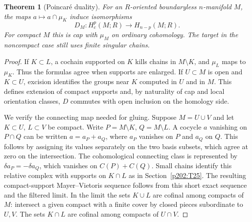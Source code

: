 \documentclass[11pt,oneside,openany]{book}
\theoremstyle{plain}
\newtheorem{theorem}{Theorem}[chapter]
\theoremstyle{definition}
\theoremstyle{remark}
\begin{document}
\begin{theorem}[Poincar\'e duality]\label{thm:p202-poincare}
For an \(R\)-oriented boundaryless \(n\)-manifold \(M\), the
maps \(a\mapsto a\cap\mu_K\) induce isomorphisms
\[
 D_M:H_c^p(M;R)\longrightarrow H_{n-p}(M;R).
\]
For compact \(M\) this is cap with \(\mu_M\) on ordinary
cohomology. The target in the noncompact case still uses
finite singular chains.
\end{theorem}

\begin{proof}
If \(K\subset L\), a cochain supported on \(K\) kills
chains in \(M\setminus K\), and \(\mu_L\) maps to \(\mu_K\).
Thus the formulas agree when supports are enlarged. If
\(U\subset M\) is open and \(K\subset U\), excision identifies
the groups near \(K\) computed in \(U\) and in \(M\).
This defines extension of compact supports and, by naturality
of cap and local orientation classes, \(D\) commutes with
open inclusion on the homology side.

We verify the connecting map needed for gluing. Suppose
\(M=U\cup V\) and let \(K\subset U\), \(L\subset V\) be
compact. Write \(P=M\setminus K\), \(Q=M\setminus L\).
A cocycle \(a\) vanishing on \(P\cap Q\) can be written
\(a=a_P+a_Q\), where \(a_P\) vanishes on \(P\) and \(a_Q\)
on \(Q\). This follows by assigning its values separately
on the two basis subsets, which agree at zero on the
intersection. The cohomological connecting class is
represented by \(\delta a_P=-\delta a_Q\), which vanishes
on \(C(P)+C(Q)\). Small chains identify this relative
complex with supports on \(K\cap L\) as in
Section~\ref{p202:T25}. The resulting compact-support
Mayer--Vietoris sequence follows from this short exact
sequence and the filtered limit. In the limit the
sets \(K\cup L\) are cofinal among compacts of \(M\):
intersect a given compact with a finite cover by closed
pieces subordinate to \(U,V\). The sets \(K\cap L\) are
cofinal among compacts of \(U\cap V\).


\end{proof}
\end{document}
